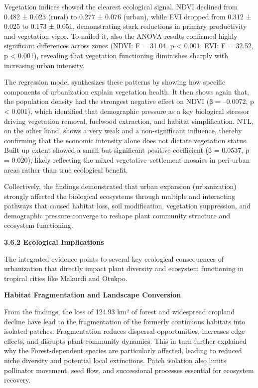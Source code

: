Vegetation indices showed the clearest ecological signal. NDVI declined from 0.482 ± 0.023 (rural) to 0.277 ± 0.076 (urban), while EVI dropped from 0.312 ± 0.025 to 0.173 ± 0.051, demonstrating stark reductions in primary productivity and vegetation vigor. To nailed it, also the ANOVA results confirmed highly significant differences across zones (NDVI: F = 31.04, p \textless{} 0.001; EVI: F = 32.52, p \textless{} 0.001), revealing that vegetation functioning diminishes sharply with increasing urban intensity.

The regression model synthesizes these patterns by showing how specific components of urbanization explain vegetation health. It then shows again that, the population density had the strongest negative effect on NDVI (β = --0.0072, p \textless{} 0.001), which identified that demographic pressure as a key biological stressor driving vegetation removal, fuelwood extraction, and habitat simplification. NTL, on the other hand, shows a very weak and a non-significant influence, thereby confirming that the economic intensity alone does not dictate vegetation status. Built-up extent showed a small but significant positive coefficient (β = 0.0537, p = 0.020), likely reflecting the mixed vegetative--settlement mosaics in peri-urban areas rather than true ecological benefit.

Collectively, the findings demonstrated that urban expansion (urbanization) strongly affected the biological ecosystems through multiple and interacting pathways that caused habitat loss, soil modification, vegetation suppression, and demographic pressure converge to reshape plant community structure and ecosystem functioning.

{}\textbf{3.6.2 Ecological Implications}

The integrated evidence points to several key ecological consequences of urbanization that directly impact plant diversity and ecosystem functioning in tropical cities like Makurdi and Otukpo.

\textbf{Habitat Fragmentation and Landscape Conversion}

From the findings, the loss of 124.93 km² of forest and widespread cropland decline have lead to the fragmentation of the formerly continuous habitats into isolated patches. Fragmentation reduces dispersal opportunities, increases edge effects, and disrupts plant community dynamics. This in turn further explained why the Forest-dependent species are particularly affected, leading to reduced niche diversity and potential local extinctions. Patch isolation also limits pollinator movement, seed flow, and successional processes essential for ecosystem recovery.

